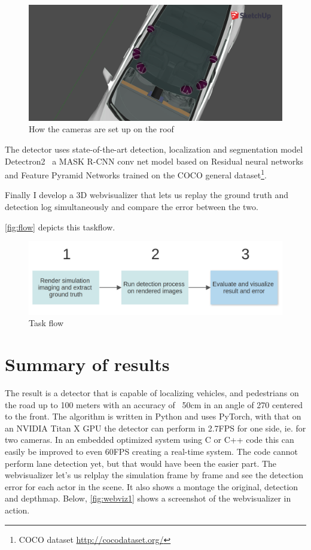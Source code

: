 \begin{figure}[!ht]
    \centering
    \includegraphics[width=150mm, keepaspectratio]{figures/3dmodel2.png}
    \caption{How the cameras are set up on the roof}
    \label{fig:3dmodel2}
\end{figure}

The detector uses state-of-the-art detection, localization and segmentation model
Detectron2~\cite{wu2019detectron2} a MASK R-CNN conv net model based on Residual
neural networks and Feature Pyramid Networks trained on the COCO general
dataset\footnote{COCO dataset \url{http://cocodataset.org/}}.

Finally I develop a 3D webvisualizer that lets us replay the ground truth and
detection log simultaneously and compare the error between the two.

\autoref{fig:flow} depicts this taskflow.

\begin{figure}[!ht]
    \centering
    \includegraphics[width=150mm, keepaspectratio]{figures/flowchart.png}
    \caption{Task flow}
    \label{fig:flow}
\end{figure}

\section{Summary of results}

The result is a detector that is capable of localizing vehicles, and pedestrians
on the road up to 100 meters with an accuracy of ~50cm in an angle of 270\degree
centered to the front. The algorithm is written in Python and uses PyTorch, with that on
an NVIDIA Titan X GPU the detector can perform in 2.7FPS for one side, ie. for
two cameras. In an embedded optimized system using C or C++ code this can easily
be improved to even 60FPS creating a real-time system. The code cannot perform
lane detection yet, but that would have been the easier part. The webvisualizer
let's us relplay the simulation frame by frame and see the detection error for
each actor in the scene. It also shows a montage the original, detection and
depthmap. Below, \autoref{fig:webviz1} shows a screenshot of the webvisualizer
in action.

